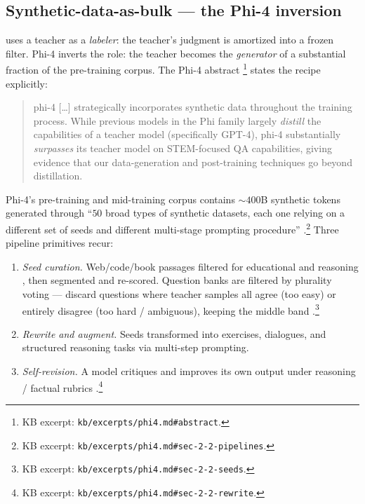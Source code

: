 \subsection{Synthetic-data-as-bulk --- the Phi-4 inversion}
\label{sec:data-synthetic}

 uses a teacher  as a \emph{labeler}: the teacher's
judgment is amortized into a frozen filter. Phi-4 \citep{phi4}
inverts the role: the teacher  becomes the \emph{generator} of a
substantial fraction of the pre-training corpus. The Phi-4 abstract
\citep[abstract]{phi4}\footnote{KB excerpt:
\texttt{kb/excerpts/phi4.md\#abstract}.} states the recipe explicitly:

\begin{quote}
phi-4 [\dots] strategically incorporates synthetic data throughout
the training process. While previous models in the Phi family largely
\emph{distill} the capabilities of a teacher model (specifically
GPT-4), phi-4 substantially \emph{surpasses} its teacher model on
STEM-focused QA capabilities, giving evidence that our data-generation
and post-training techniques go beyond distillation.
\end{quote}

Phi-4's pre-training and mid-training corpus contains $\sim 400$B
synthetic tokens generated through ``$50$ broad types of synthetic
datasets, each one relying on a different set of seeds and different
multi-stage prompting procedure''
\citep[\S 2.2]{phi4}.\footnote{KB excerpt:
\texttt{kb/excerpts/phi4.md\#sec-2-2-pipelines}.} Three pipeline
primitives recur:

\begin{enumerate}
\item \emph{Seed curation.} Web/code/book passages filtered for
educational and reasoning , then segmented and re-scored.
Question banks are filtered by plurality voting --- discard
questions where teacher samples all agree (too easy) or entirely
disagree (too hard / ambiguous), keeping the middle band
\citep[\S 2.2]{phi4}.\footnote{KB excerpt:
\texttt{kb/excerpts/phi4.md\#sec-2-2-seeds}.}
\item \emph{Rewrite and augment.} Seeds transformed into exercises,
dialogues, and structured reasoning tasks via multi-step prompting.
\item \emph{Self-revision.} A model critiques and improves its own
output under reasoning / factual rubrics
\citep[\S 2.2]{phi4}.\footnote{KB excerpt:
\texttt{kb/excerpts/phi4.md\#sec-2-2-rewrite}.}
\end{enumerate}

